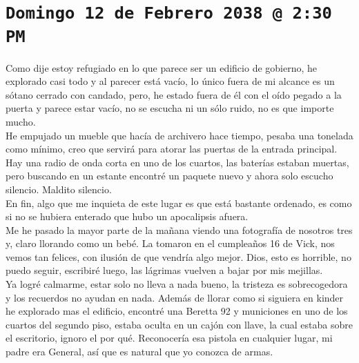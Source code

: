 \vspace*{1.5cm}
\section*{\texttt{Domingo 12 de Febrero 2038 @ 2:30 PM}}
\vspace*{1.5cm}

Como dije estoy refugiado en lo que parece ser un edificio de gobierno, he explorado casi todo y al parecer está vacío, lo único fuera de mi alcance es un sótano cerrado con candado, pero, he estado fuera de él con el oído pegado a la puerta y parece estar vacío, no se escucha ni un sólo ruido, no es que importe mucho.\\ He empujado un mueble que hacía de archivero hace tiempo, pesaba una tonelada como mínimo, creo que servirá para atorar las puertas de la entrada principal.
Hay una radio de onda corta en uno de los cuartos, las baterías estaban muertas, pero buscando en un estante encontré un paquete nuevo y ahora solo escucho silencio. Maldito silencio.\\
En fin, algo que me inquieta de este lugar es que está bastante ordenado, es como si no se hubiera enterado que hubo un apocalipsis afuera.\\
Me he pasado la mayor parte de la mañana viendo una fotografía de nosotros tres y, claro llorando como un bebé. La tomaron en el cumpleaños 16 de Vick, nos vemos tan felices, con ilusión de que vendría algo mejor. Dios, esto es horrible, no puedo seguir, escribiré luego, las lágrimas vuelven a bajar por mis mejillas.\\[4cm]
Ya logré calmarme, estar solo no lleva a nada bueno, la tristeza es sobrecogedora y los recuerdos no ayudan en nada. Además de llorar como si siguiera en kinder he explorado mas el edificio, encontré una Beretta 92 y municiones en uno de los cuartos del segundo piso, estaba oculta en un cajón con llave, la cual estaba sobre el escritorio, ignoro el por qué. Reconocería esa pistola en cualquier lugar, mi padre era General, así que es natural que yo conozca de armas.

